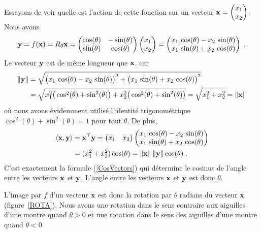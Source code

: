 {\begin{egg}
Essayons de voir quelle est l'action de cette fonction sur un vecteur
$\displaystyle \mathbf{x} = \begin{pmatrix} x_1 \\ x_2 \end{pmatrix}$.
Nous avons
\[
\mathbf{y} = f(\mathbf{x}) = R_\theta \mathbf{x} =
\begin{pmatrix}
\cos(\theta) & -\sin(\theta) \\ \sin(\theta) & \cos(\theta)
\end{pmatrix}
\begin{pmatrix} x_1 \\ x_2 \end{pmatrix}
= \begin{pmatrix}
x_1\,\cos(\theta) -x_2\,\sin(\theta) \\ x_1\,\sin(\theta) +x_2\, \cos(\theta)
\end{pmatrix} \; .
\]
Le vecteur $\mathbf{y}$ est de même longueur que $\mathbf{x}$. car
\begin{align*}
\|\mathbf{y}\| &= \sqrt{\big(x_1\,\cos(\theta) -x_2\,\sin(\theta)\big)^2 
+\big(x_1\,\sin(\theta) +x_2\, \cos(\theta)\big)^2} \\
&=\sqrt{ x_1^2\big(\cos^2(\theta)+\sin^2(\theta)\big) +
x_2^2\big(\cos^2(\theta)+\sin^2(\theta)\big)}
= \sqrt{ x_1^2 + x_2^2 } = \|\mathbf{x}\|
\end{align*}
où nous avons évidemment utilisé l'identité trigonométrique
$\cos^2(\theta) + \sin^2(\theta) =1$ pour tout $\theta$.  De plus,
\begin{align*}
\left\langle{\mathbf{x}} , {\mathbf{y}}\right\rangle
&= \mathbf{x}^\top \mathbf{y}
= \begin{pmatrix} x_1 & x_2 \end{pmatrix}
\begin{pmatrix}
x_1\,\cos(\theta) -x_2\,\sin(\theta) \\ x_1\,\sin(\theta) +x_2\, \cos(\theta)
\end{pmatrix} \\
&= (x_1^2+x_2^2)\cos(\theta)
= \|\mathbf{x}\|\,\|\mathbf{y}\| \cos(\theta) \; .
\end{align*}
C'est exactement la formule (\ref{CosVectors}) qui détermine le
cosinus de l'angle entre les vecteurs $\mathbf{x}$ et $\mathbf{y}$.  L'angle
entre les vecteurs $\mathbf{x}$ et $\mathbf{y}$ est donc $\theta$.

L'image par $f$ d'un vecteur $\mathbf{x}$ est donc la rotation par
$\theta$ radians du vecteur $\mathbf{x}$ (figure~\ref{ROTA}).  Nous avons
une rotation dans le sens contraire aux aiguilles d'une montre quand
$\theta>0$ et une rotation dans le sens des aiguilles d'une montre
quand $\theta<0$.


\end{egg}}

